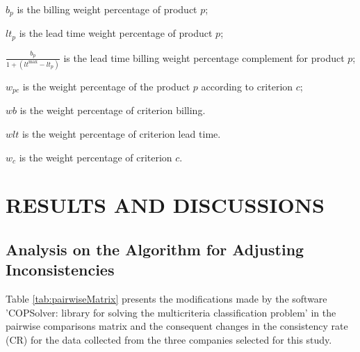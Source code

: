 \documentclass[10pt,fleqn,a4paper,twoside]{article}
\begin{document}
$b_p$ is the billing weight percentage of product $p$;

$lt_p$ is the lead time weight percentage of product $p$;

$\frac{b_p}{1 + (lt^{\max} - lt_p)}$ is the lead time billing weight percentage complement for product $p$;

$w_{pc}$ is the weight percentage of the product $p$ according to criterion $c$;

$wb$ is the weight percentage of criterion billing.

$wlt$ is the weight percentage of criterion lead time.

$w_{c}$ is the weight percentage of criterion $c$.

    
    \section{RESULTS AND DISCUSSIONS}
    
    \subsection{Analysis on the Algorithm for Adjusting Inconsistencies}
    
    Table \ref{tab:pairwiseMatrix} presents the modifications made by the software 'COPSolver: library for solving the multicriteria classification problem' in the pairwise comparisons matrix and the consequent changes in the consistency rate (CR) for the data collected from the three companies selected for this study.
\end{document}
